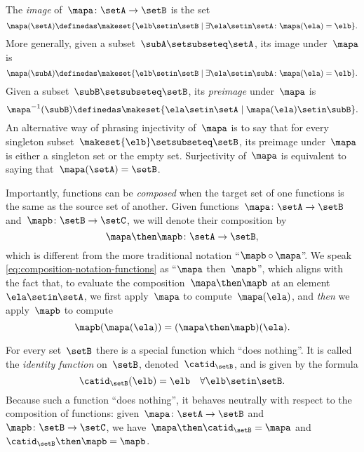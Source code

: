 The \emph{image} of~$\mapa\colon \setA \to \setB$ is the set
\begin{equation*}
    \mapa(\setA) \definedas \makeset{ \elb \setin\setB \mid \exists \ela \setin\setA \colon \mapa(\ela) = \elb }.
\end{equation*}
More generally, given a subset~$\subA \setsubseteq \setA$, its image under~$\mapa$ is
\begin{equation*}
    \mapa(\subA) \definedas \makeset{ \elb \setin\setB \mid \exists \ela \setin\subA \colon \mapa(\ela) = \elb }.
\end{equation*}
Given a subset~$\subB \setsubseteq \setB$, its \emph{preimage} under~$\mapa$ is
\begin{equation*}
    \mapa^{-1}(\subB) \definedas \makeset{ \ela \setin\setA \mid  \mapa(\ela) \setin\subB }.
\end{equation*}
An alternative way of phrasing injectivity of~$\mapa$ is to say that for every singleton subset~$\makeset{ \elb } \setsubseteq \setB$, its preimage under~$\mapa$ is either a singleton set or the empty set.
Surjectivity of~$\mapa$ is equivalent to saying that~$\mapa(\setA) = \setB$.

Importantly, functions can be \emph{composed} when the target set of one functions is the same as the source set of another.
Given functions~$\mapa\colon \setA \to \setB$ and~$\mapb \colon \setB \to \setC$, we will denote their composition by
\begin{equation}
    \label{eq:composition-notation-functions}
    \mapa \then \mapb \colon \setA \to \setB,
\end{equation}
which is different from the more traditional notation ``$\mapb \circ \mapa$''.
We speak \cref{eq:composition-notation-functions} as ``$\mapa$ then~$\mapb$'', which aligns with the fact that, to evaluate the composition~$\mapa \then \mapb$ at an element~$\ela \setin\setA$, we first apply~$\mapa$ to compute~$\mapa(\ela)$, and \emph{then} we apply~$\mapb$ to compute
\begin{equation*}
    \mapb(\mapa(\ela))=(\mapa \then \mapb)(\ela).
\end{equation*}

For every set~$\setB$ there is a special function which ``does nothing''.
It is called the \emph{identity function} on~$\setB$, denoted~$\catid_\setB$, and is given by the formula
\begin{equation*}
    \catid_\setB(\elb) = \elb \quad \forall  \elb \setin\setB.
\end{equation*}
Because such a function ``does nothing'', it behaves neutrally with respect to the composition of functions: given~$\mapa \colon \setA \to \setB$ and~$\mapb \colon \setB \to \setC$, we have~$\mapa \then \catid_\setB = \mapa$ and~$\catid_\setB \then \mapb = \mapb$.

